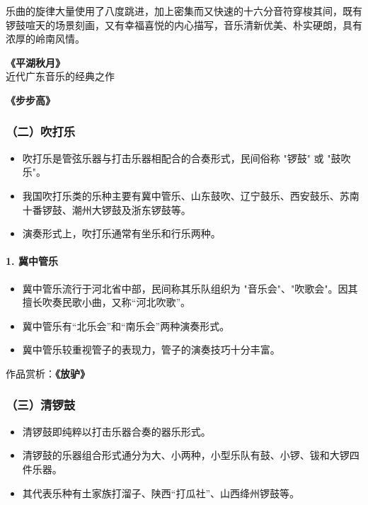 \documentclass[
]{article}
\providecommand{\tightlist}{%
  \setlength{\itemsep}{0pt}\setlength{\parskip}{0pt}}
\begin{document}
乐曲的旋律大量使用了八度跳进，加上密集而又快速的十六分音符穿梭其间，既有锣鼓喧天的场景刻画，又有幸福喜悦的内心描写，音乐清新优美、朴实硬朗，具有浓厚的岭南风情。

\textbf{《平湖秋月》}\\
近代广东音乐的经典之作

\textbf{《步步高》}

\subsubsection{（二）吹打乐}\label{ux4e8cux5439ux6253ux4e50}

\begin{itemize}
\tightlist
\item
  吹打乐是管弦乐器与打击乐器相配合的合奏形式，民间俗称 "锣鼓" 或
  "鼓吹乐"。
\item
  我国吹打乐类的乐种主要有冀中管乐、山东鼓吹、辽宁鼓乐、西安鼓乐、苏南十番锣鼓、潮州大锣鼓及浙东锣鼓等。
\item
  演奏形式上，吹打乐通常有坐乐和行乐两种。
\end{itemize}

\paragraph{1. 冀中管乐}\label{ux5180ux4e2dux7ba1ux4e50}

\begin{itemize}
\tightlist
\item
  冀中管乐流行于河北省中部，民间称其乐队组织为
  "音乐会"、"吹歌会"。因其擅长吹奏民歌小曲，又称``河北吹歌''。
\item
  冀中管乐有``北乐会''和``南乐会''两种演奏形式。
\item
  冀中管乐较重视管子的表现力，管子的演奏技巧十分丰富。
\end{itemize}

作品赏析：\textbf{《放驴》}

\subsubsection{（三）清锣鼓}\label{ux4e09ux6e05ux9523ux9f13}

\begin{itemize}
\tightlist
\item
  清锣鼓即纯粹以打击乐器合奏的器乐形式。
\item
  清锣鼓的乐器组合形式通分为大、小两种，小型乐队有鼓、小锣、钹和大锣四件乐器。
\item
  其代表乐种有土家族打溜子、陕西``打瓜社''、山西绛州锣鼓等。
\end{itemize}
\end{document}
